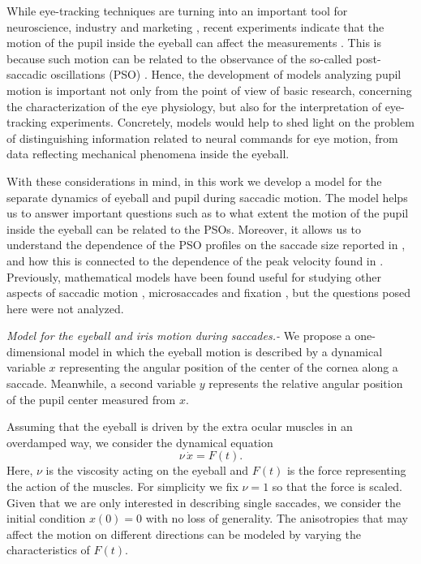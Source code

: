 \documentclass[prl]{revtex4}
\begin{document}
While eye-tracking techniques are turning into an important tool for neuroscience, industry and marketing 
\cite{Duch}, recent experiments indicate that the motion of the pupil inside the eyeball can affect the measurements 
\cite{holm2016}. This is because such motion can be related to the observance of the so-called post-saccadic oscillations (PSO) \cite{holm2013}. Hence, the development of models analyzing pupil motion is important 
not only from the point of view of basic research, concerning the characterization of the eye physiology, but also for the interpretation of eye-tracking experiments. Concretely, models would help to shed light on the problem of distinguishing  information related to neural commands for eye motion, from data reflecting mechanical phenomena inside the eyeball.

With these considerations in mind, in this work we develop a model for the separate dynamics of eyeball and pupil during saccadic motion. The model helps us to answer important questions such as to what extent the motion of the pupil inside the eyeball can be related to the PSOs. Moreover, it allows us to understand the dependence of the PSO profiles on the saccade size reported in \cite{holm}, and how this is connected to the dependence of the peak velocity found in \cite{Otero:2008,MartinezC:2013}. Previously, mathematical models have been found useful for studying other aspects of saccadic motion \cite{Enderle:2010,Artal:2014,gasaneo2017,kliegl2},
microsaccades \cite{chino1,chino2} and fixation \cite{liang,Merge,kliegl1}, but the questions posed here were not analyzed. 

{\em Model for the eyeball and iris motion during saccades.-} We propose a 
one-dimensional model in which the eyeball motion is described by a dynamical variable $x$ representing the angular position of the center of the cornea along a saccade. Meanwhile, a second variable $y$ represents the relative angular position of the  pupil center measured from $x$.

Assuming that the eyeball is driven by the extra ocular muscles in an overdamped way, we consider the dynamical equation
\begin{equation}
\label{xpunto}
\nu \, \dot{x}=F(t).
\end{equation} 
Here, $\nu$ is the viscosity acting on the eyeball and $F(t)$ is the force representing the action of the muscles. For simplicity we fix $\nu=1$ so that the force is scaled. Given that we are only interested in describing single saccades, we consider the initial condition $x(0)=0$ with no loss of generality. The anisotropies that may affect the motion on different directions can be modeled
by varying the characteristics of $F(t)$.
\end{document}
